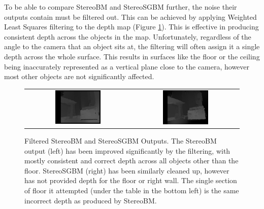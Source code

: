 To be able to compare StereoBM and StereoSGBM further, the noise their outputs contain must be filtered out. This can be achieved by applying Weighted Least Squares filtering to the depth map (Figure \ref{fig:filtered}). This is effective in producing consistent depth across the objects in the map. Unfortunately, regardless of the angle to the camera that an object sits at, the filtering will often assign it a single depth across the whole surface. This results in surfaces like the floor or the ceiling being inaccurately represented as a vertical plane close to the camera, however most other objects are not significantly affected.


\begin{figure}[H]
    \begin{center}
      \begin{tabular}{ c c }
        \includegraphics[width=0.45\textwidth]{Figures/BMfiltered.jpg} &
        \includegraphics[width=0.45\textwidth]{Figures/sgbmfilt.jpg}
      \end{tabular}
      \caption[Filtered StereoBM and StereoSGBM Outputs]{Filtered StereoBM and StereoSGBM Outputs. The StereoBM output (left) has been improved significantly by the filtering, with mostly consistent and correct depth across all objects other than the floor. StereoSGBM (right) has been similarly cleaned up, however has not provided depth for the floor or right wall. The single section of floor it attempted (under the table in the bottom left) is the same incorrect depth as produced by StereoBM.}
      \label{fig:filtered}
    \end{center}
\end{figure}

